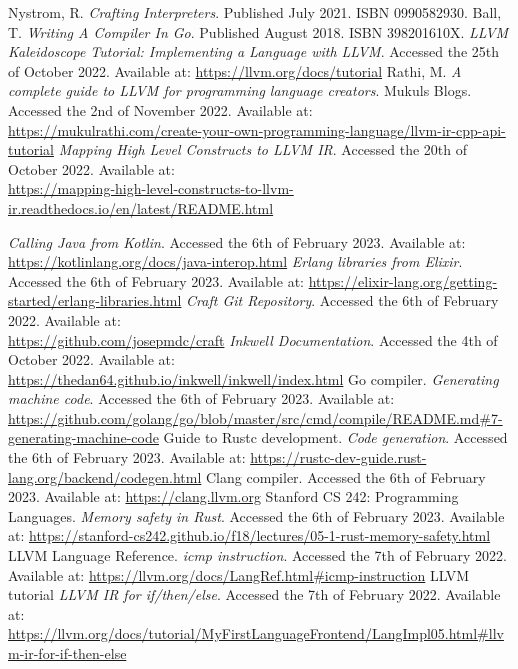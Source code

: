 ﻿\documentclass[10pt,a4paper,twocolumn,twoside]{article}
\begin{document}
\renewcommand\refname{Bibliography}
\begin{thebibliography}{11}
 Nystrom, R. \textit{Crafting Interpreters}. Published July 2021. ISBN 0990582930.
 Ball, T. \textit{Writing A Compiler In Go}. Published August 2018. ISBN 398201610X.
 \textit{LLVM Kaleidoscope Tutorial: Implementing a Language with LLVM}. Accessed the 25th of October 2022. Available at: \url{https://llvm.org/docs/tutorial}
 Rathi, M. \textit{A complete guide to LLVM for programming language creators}. Mukuls Blogs. Accessed the 2nd of November 2022. Available at: \\\url{https://mukulrathi.com/create-your-own-programming-language/llvm-ir-cpp-api-tutorial}
 \textit{Mapping High Level Constructs to LLVM IR}. Accessed the 20th of October 2022. Available at: \\\url{https://mapping-high-level-constructs-to-llvm-ir.readthedocs.io/en/latest/README.html}
\end{thebibliography}

\renewcommand\refname{References}
\begin{thebibliography}{11}
 \textit{Calling Java from Kotlin}. Accessed the 6th of February 2023. Available at: \url{https://kotlinlang.org/docs/java-interop.html}
 \textit{Erlang libraries from Elixir}. Accessed the 6th of February 2023. Available at: \url{https://elixir-lang.org/getting-started/erlang-libraries.html}
 \textit{Craft Git Repository}. Accessed the 6th of February 2022. Available at: \\\url{https://github.com/josepmdc/craft}
 \textit{Inkwell Documentation}. Accessed the 4th of October 2022. Available at: \\\url{https://thedan64.github.io/inkwell/inkwell/index.html}
Go compiler. \textit{Generating machine code}. Accessed the 6th of February 2023. Available at: \url{https://github.com/golang/go/blob/master/src/cmd/compile/README.md#7-generating-machine-code}
 Guide to Rustc development. \textit{Code generation}. Accessed the 6th of February 2023. Available at: \url{https://rustc-dev-guide.rust-lang.org/backend/codegen.html}
 Clang compiler. Accessed the 6th of February 2023. Available at: \url{https://clang.llvm.org}
 Stanford CS 242: Programming Languages. \textit{Memory safety in Rust}. Accessed the 6th of February 2023. Available at: \url{https://stanford-cs242.github.io/f18/lectures/05-1-rust-memory-safety.html}
 LLVM Language Reference. \textit{icmp instruction}. Accessed the 7th of February 2022. Available at: \url{https://llvm.org/docs/LangRef.html#icmp-instruction}
 LLVM tutorial \textit{LLVM IR for if/then/else}. Accessed the 7th of February 2022. Available at: \url{https://llvm.org/docs/tutorial/MyFirstLanguageFrontend/LangImpl05.html#llvm-ir-for-if-then-else}
\end{thebibliography}
\end{document}
